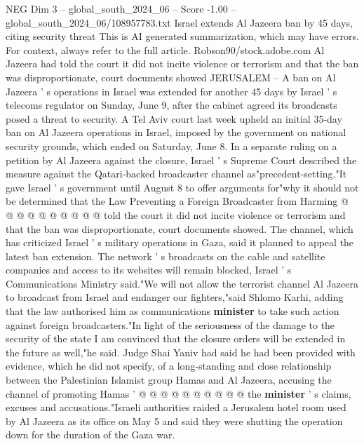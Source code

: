 \begin{textsample}{NEG Dim 3 – global\_south\_2024\_06 – Score -1.00 – global\_south\_2024\_06/108957783.txt}  \label{ex:f3_neg_120}
Israel extends Al Jazeera ban by 45 days, citing security threat This is AI generated summarization, which may have errors.
For context, always refer to the full article.
Robson90/stock.adobe.com Al Jazeera had told the court it did not incite violence or terrorism and that the ban was disproportionate, court documents showed JERUSALEM -- A ban on Al Jazeera ' s operations in Israel was extended for another 45 days by Israel ' s telecoms regulator on Sunday, June 9, after the cabinet agreed its broadcasts posed a threat to security.
A Tel Aviv court last week upheld an initial 35-day ban on Al Jazeera operations in Israel, imposed by the government on national security grounds, which ended on Saturday, June 8.
In a separate ruling on a petition by Al Jazeera against the closure, Israel ' s Supreme Court described the measure against the Qatari-backed broadcaster channel as"precedent-setting."It gave Israel ' s government until August 8 to offer arguments for"why it should not be determined that the Law Preventing a Foreign Broadcaster from Harming @ @ @ @ @ @ @ @ @ @ told the court it did not incite violence or terrorism and that the ban was disproportionate, court documents showed.
The channel, which has criticized Israel ' s military operations in Gaza, said it planned to appeal the latest ban extension.
The network ' s broadcasts on the cable and satellite companies and access to its websites will remain blocked, Israel ' s Communications Ministry said."We will not allow the terrorist channel Al Jazeera to broadcast from Israel and endanger our fighters,"said Shlomo Karhi, adding that the law authorised him as communications \textbf{minister} to take such action against foreign broadcasters."In light of the seriousness of the damage to the security of the state I am convinced that the closure orders will be extended in the future as well,"he said.
Judge Shai Yaniv had said he had been provided with evidence, which he did not specify, of a long-standing and close relationship between the Palestinian Islamist group Hamas and Al Jazeera, accusing the channel of promoting Hamas ' @ @ @ @ @ @ @ @ @ @ the \textbf{minister} ' s claims, excuses and accusations."Israeli authorities raided a Jerusalem hotel room used by Al Jazeera as its office on May 5 and said they were shutting the operation down for the duration of the Gaza war.

\end{textsample}
